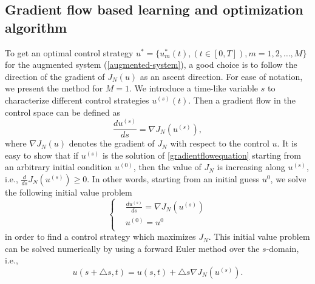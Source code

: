 \documentclass[letterpaper, 10 pt, conference]{ieeeconf}
\begin{document}
\subsection{Gradient flow based learning and optimization algorithm}
\label{sec2.3}

To get an optimal control strategy $u^{*}=\{u^{*}_{m}(t), (t \in
[0,T]), m=1,2,\ldots, M\}$ for the augmented system
(\ref{augmented-system}), a good choice is to follow the
direction of the gradient of $J_N(u)$ as an ascent direction. For
ease of notation, we present the method for $M=1$. We introduce a
time-like variable $s$ to characterize different control
strategies $u^{(s)}(t)$. Then a gradient flow in the control space
can be defined as
\begin{equation}\label{gradientflowequation}
\frac{du^{(s)}}{ds} =\nabla J_N(u^{(s)}),
\end{equation}
where $\nabla J_N(u)$ denotes the gradient of $J_N$ with respect
to the control $u$. It is easy to show that if $u^{(s)}$ is the
solution of \eqref{gradientflowequation} starting from an
arbitrary initial condition $u^{(0)}$, then the value of $J_N$ is
increasing along $u^{(s)}$, i.e., $\frac{d}{ds}J_N(u^{(s)})\geq
0$. In other words, starting from an initial guess $u^{0}$, we
solve the following initial value problem
\begin{equation}\label{gradientflowequation2}
\left\{\begin{split}
  & \frac{du^{(s)}}{ds} = \nabla J_N(u^{(s)}) \\
  & u^{(0)}=u^{0} \\
\end{split}\right.
\end{equation}
in order to find a control strategy which maximizes $J_N$. This
initial value problem can be solved numerically by using a forward
Euler method over
the $s$-domain, i.e.,
\begin{equation}\label{iteration1}
u(s+\triangle s, t)=u(s,t)+\triangle s\nabla J_N(u^{(s)}).
\end{equation}
\end{document}
